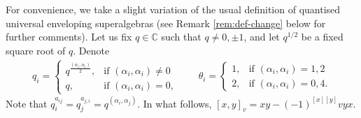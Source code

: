 \documentclass[12pt]{amsart}
\theoremstyle{definition}
\theoremstyle{remark}
\numberwithin{equation}{section}
\begin{document}
For convenience, we take a slight variation of the usual definition \cite{BGZ, Y, ZGB} of quantised universal enveloping superalgebras (see Remark \ref{rem:def-change} below for further comments).
Let us
fix $q\in{\mathbb{{C}}}$ such that $q\ne 0, \pm 1$, and let $q^{1/2}$ be a fixed
square root of $q$.  Denote
\[
\begin{aligned}
q_i=\begin{cases}q^{\frac{(\alpha_i,\alpha_i)}{2}},&\mbox{if }({\alpha}_i,{\alpha}_i)\neq 0\\q,&\mbox{if }({\alpha}_i,{\alpha}_i)=0,
\end{cases}\qquad
\theta_i=\begin{cases}1,&\mbox{if }({\alpha}_i,{\alpha}_i)=1,2\\2,&\mbox{if }({\alpha}_i,{\alpha}_i)=0,4.\end{cases}
\end{aligned}
\]
Note that $q_i^{a_{ij}}=q_j^{a_{j,i}}=q^{(\alpha_i,\alpha_j)}$. In what follows, $[x,y]_v=xy-(-1)^{[x][y]}v yx$.
\end{document}
